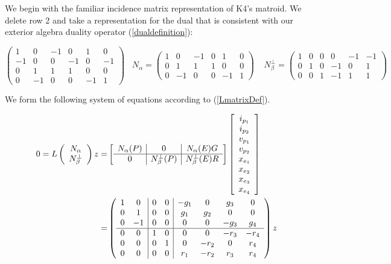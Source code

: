 We begin with the familiar incidence matrix representation of K4's matroid.
We delete row 2 and take a representation for the dual that is consistent
with our exterior algebra duality operator (\ref{dualdefinition}):


\[
\left(\begin{array}{cc|cccc}
1 & 0 & -1 & 0 & 1 & 0 \\
-1 & 0 & 0 & -1 & 0 & -1 \\
0 & 1 & 1 & 1 & 0 & 0 \\
0 & -1 & 0 & 0 & -1 & 1
\end{array}\right)
\;\;\;
N_\alpha=
\left(\begin{array}
{cc|cccc}
1 & 0 & -1 & 0 & 1 & 0 \\
0 & 1 & 1 & 1 & 0 & 0 \\
0 & -1 & 0 & 0 & -1 & 1
\end{array}\right)
\;\;\;\;
N_\beta^\perp =
\left(\begin{array}{cc|cccc}
1 & 0 & 0 & 0 & -1 & -1 \\
0 & 1 & 0 & -1 & 0 & 1 \\
0 & 0 & 1 & -1 & 1 & 1
\end{array}\right)
\]


We form the following system of equations according to (\ref{LmatrixDef}).

\begin{equation}\label{K4Equation}
\begin{split}
  0=L\left(\begin{array}{cc} {\ensuremath{N_{\alpha}}} \\ {N_{\beta}^{\perp}}  \end{array}\right)z
    =& \left[\begin{array}{c|c|c} N_{\alpha}(P)  &  0  &  N_{\alpha}(E)G \\  \hline
        0  & N_{\beta}^{\perp}(P)  &  N_{\beta}^{\perp}(E)R \end{array}\right]
    \left[ \begin{array}{c} i_{p_1} \\ i_{p_2} \\ v_{p_1} \\ v_{p_2} \\ x_{e_1} \\ x_{e_2} \\ x_{e_3} \\ x_{e_4}
      \end{array}
      \right]
    \\
    =&
\left(\begin{array}{cc|cc|cccc}
1 & 0 & 0 & 0 & -g_{1} & 0 & g_{3} & 0 \\
0 & 1 & 0 & 0 & g_{1} & g_{2} & 0 & 0 \\
0 & -1 & 0 & 0 & 0 & 0 & -g_{3} & g_{4} \\ \hline
0 & 0 & 1 & 0 & 0 & 0 & -r_{3} & -r_{4} \\
0 & 0 & 0 & 1 & 0 & -r_{2} & 0 & r_{4} \\
0 & 0 & 0 & 0 & r_{1} & -r_{2} & r_{3} & r_{4}
\end{array}\right)z
\end{split}
\end{equation}


